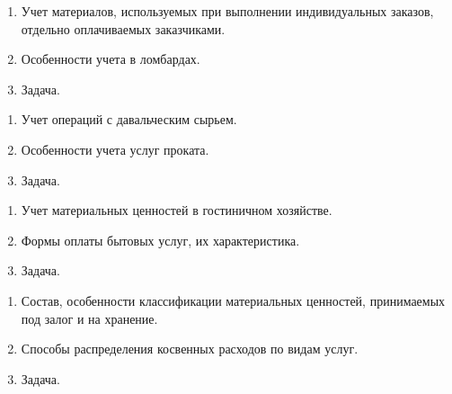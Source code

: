 \newpage


\shapkFull
\setcounter{zad}{0}

\begin{enumerate}
	\item Учет материалов, используемых при выполнении индивидуальных заказов, отдельно оплачиваемых заказчиками.

	\item Особенности учета в ломбардах.

	\item Задача.
\end{enumerate}

\newpage


\shapkFull
\setcounter{zad}{0}

\begin{enumerate}
	\item Учет операций с давальческим сырьем.

	\item Особенности учета услуг проката.

	\item Задача.
\end{enumerate}

\newpage


\shapkFull
\setcounter{zad}{0}

\begin{enumerate}
	\item Учет материальных ценностей в гостиничном хозяйстве.

	\item Формы оплаты бытовых услуг, их характеристика.

	\item Задача.
\end{enumerate}

\newpage


\shapkFull
\setcounter{zad}{0}

\begin{enumerate}
	\item Состав, особенности классификации материальных ценностей, принимаемых под залог и на хранение.

	\item Способы распределения косвенных расходов по видам услуг.

	\item Задача.
\end{enumerate}

